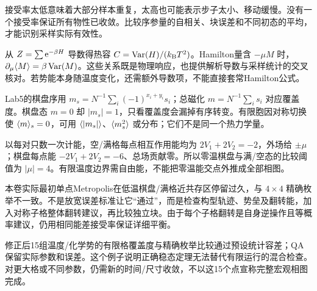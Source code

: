 接受率太低意味着大部分样本重复，太高也可能表示步子太小、移动缓慢。没有一个接受率保证所有物性已收敛。比较序参量的自相关、块误差和不同初态的平均，才能识别采样实际有效性。

从 $Z=\sum\mathrm e^{-\beta H}$ 导数得热容 $C=\operatorname{Var}(H)/(k_{\mathrm B} T^2)$。Hamilton量含 $-\mu M$ 时，$\partial_\mu\langle M\rangle=\beta\operatorname{Var}(M)$。这些关系既是物理响应，也提供解析导数与采样统计的交叉核对。若势能本身随温度变化，还需额外导数项，不能直接套常Hamilton公式。

Lab5的棋盘序用 $m_s=N^{-1}\sum_i(-1)^{x_i+y_i}s_i$；总磁化 $m=N^{-1}\sum_i s_i$ 对应覆盖度。棋盘态 $m=0$ 却 $|m_s|=1$，只看覆盖度会漏掉有序转变。有限胞因对称切换使 $\langle m\rangle_s=0$，可用 $\langle |m_s|\rangle$、$\langle m_s^2\rangle$ 或分布；它们不是同一个热力学量。

以每对只数一次计能，空/满格每点相互作用能均为 $2V_1+2V_2=-2$，外场给 $\pm\mu$；棋盘每点能 $-2V_1+2V_2=-6$、总场贡献零。所以零温棋盘与满/空态的比较阈值为 $|\mu|=4$。有限温度边界需自由能，不能把零温能交点外推成全部相图。

本卷实际最初单点Metropolis在低温棋盘/满格近共存区停留过久，与 $4\times4$ 精确枚举不一致。不是放宽误差标准让它“通过”，而是检查构型轨迹、势垒及翻转能，加入对称子格整体翻转建议，再比较独立块。由于每个子格翻转是自身逆操作且等概率建议，仍用相同能差接受率保证详细平衡。

修正后15组温度/化学势的有限格覆盖度与精确枚举比较通过预设统计容差；QA保留实际参数和误差。这个例子说明正确稳态定理无法替代有限运行的混合检查。对更大格或不同参数，仍需新的时间/尺寸收敛，不以这15个点宣称完整宏观相图完成。

